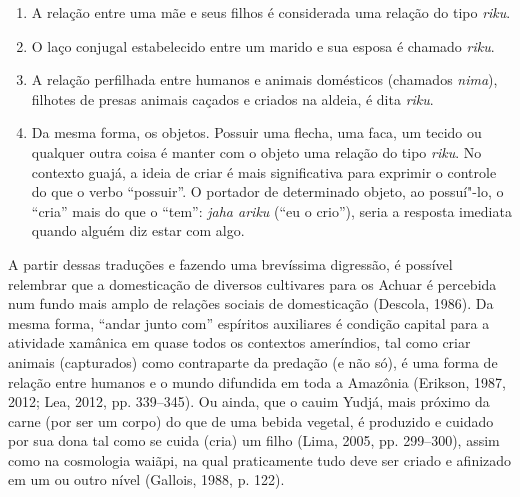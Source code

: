 \begin{enumerate}
\item A relação entre uma mãe e seus filhos é considerada uma relação do
tipo \emph{riku}.
\item O laço conjugal estabelecido entre um marido e sua esposa é chamado
\emph{riku}.
\item A relação perfilhada entre humanos e animais domésticos (chamados
\emph{nima}), filhotes de presas animais caçados e criados na aldeia, é
dita \emph{riku}.
\item Da mesma forma, os objetos. Possuir uma flecha, uma faca, um tecido
ou qualquer outra coisa é manter com o objeto uma relação do tipo
\emph{riku}. No contexto guajá, a ideia de criar é mais significativa
para exprimir o controle do que o verbo ``possuir''. O portador de
determinado objeto, ao possuí"-lo, o ``cria'' mais do que o ``tem'':
\emph{jaha ariku} (``eu o crio''), seria a resposta imediata quando
alguém diz estar com algo.
\end{enumerate}

A partir dessas traduções e fazendo uma brevíssima digressão, é possível
relembrar que a domesticação de diversos cultivares para os Achuar é
percebida num fundo mais amplo de relações sociais de domesticação
(Descola, 1986). Da mesma forma, ``andar junto com'' espíritos auxiliares é
condição capital para a atividade xamânica em quase todos os contextos
ameríndios, tal como criar animais (capturados) como contraparte da
predação (e não só), é uma forma de relação entre humanos e o mundo
difundida em toda a Amazônia (Erikson, 1987, 2012; Lea, 2012, pp. 339--345). Ou
ainda, que o cauim Yudjá, mais próximo da carne (por ser um corpo) do
que de uma bebida vegetal, é produzido e cuidado por sua dona tal como
se cuida (cria) um filho (Lima, 2005, pp. 299--300), assim como na cosmologia
waiãpi, na qual praticamente tudo deve ser criado e afinizado em um ou
outro nível (Gallois, 1988, p. 122).

